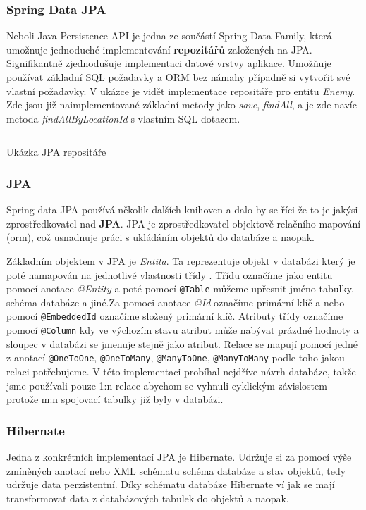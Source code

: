 \subsubsection*{Spring Data JPA}
Neboli Java Persistence API je jedna ze součástí Spring Data Family, která umožnuje jednoduché implementování \textbf{repozitářů} založených na JPA. Signifikantně zjednodušuje implementaci datové vrstvy aplikace. Umožňuje používat základní SQL požadavky a ORM bez námahy případně si vytvořit své vlastní požadavky. V ukázce  je vidět implementace repositáře pro entitu \textit{Enemy}. Zde jsou již naimplementované základní metody jako \textit{save}, \textit{findAll}, a je zde navíc metoda \textit{findAllByLocationId} s vlastním SQL dotazem.

\begin{listing}[ht!]
    \inputminted[]{Java}{resources/code/impl/EnemyRepo.java}
    \caption{Ukázka JPA repositáře}
    \label{code:JPA_repo}
\end{listing}

\subsubsection*{JPA}
Spring data JPA používá několik dalších knihoven a dalo by se říci že to je jakýsi zprostředkovatel nad \textbf{JPA}. JPA je zprostředkovatel objektově relačního mapování (\gls{orm}), což usnadnuje práci s ukládáním objektů do databáze a naopak.

Základním objektem v JPA je \textit{Entita}. Ta reprezentuje objekt v databázi který je poté namapován na jednotlivé vlastnosti třídy .
Třídu označíme jako entitu pomocí anotace \textit{@Entity} a poté pomocí \texttt{@Table} můžeme upřesnit jméno tabulky, schéma databáze a jiné.Za pomoci anotace \textit{@Id} označíme primární klíč a nebo pomocí \texttt{@EmbeddedId} označíme složený primární klíč. Atributy třídy označíme pomocí \texttt{@Column} kdy ve výchozím stavu atribut může nabývat prázdné hodnoty a sloupec v databázi se jmenuje stejně jako atribut. Relace se mapují pomocí jedné z anotací \texttt{@OneToOne}, \texttt{@OneToMany}, \texttt{@ManyToOne}, \texttt{@ManyToMany} podle toho jakou relaci potřebujeme. V této implementaci probíhal nejdříve návrh databáze, takže jsme používali pouze 1:n relace abychom se vyhnuli cyklickým závislostem protože m:n spojovací tabulky již byly v databázi.

\subsubsection*{Hibernate}\label{sec:impl:hibernate}
Jedna z konkrétních implementací JPA je Hibernate. Udržuje si za pomocí výše zmíněných anotací nebo XML  schématu schéma databáze a stav objektů, tedy udržuje data perzistentní. Díky schématu databáze Hibernate ví jak se mají transformovat data z databázových tabulek do objektů a naopak. \cite[]{enwiki:1217225259}

